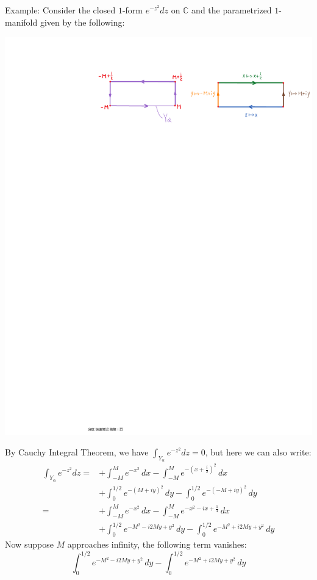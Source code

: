 \documentclass[15pt]{book}
\theoremstyle{break}
\theoremstyle{break}
\newcommand{\Complex}{\mathbb{C}}
\newcommand{\example}{\color{green}Example: \color{black}}
\begin{document}
\hfill\break
\hfill\break
\example Consider the closed $1$-form $e^{-z^2} dz$ on $\Complex$ and the parametrized $1$-manifold given by the following:\\
\begin{center}
\includegraphics[scale=0.9]{paths.pdf}
\end{center}

By Cauchy Integral Theorem, we have $\int_{Y_\alpha} e^{-z^2} dz = 0$, but here we can also write:
\begin{align*}
\int_{Y_\alpha}e^{-z^2} dz 
=& +\int_{-M}^M e^{-x^2}\, dx - \int_{-M}^M e^{-\left(x+\frac{i}{2}\right)^2} \,dx \\
&+ \int_{0}^{1/2} e^{-(M+iy)^2} \, dy - \int_0^{1/2}e^{-(-M+iy)^2}\, dy\\
=& + \int_{-M}^M e^{-x^2}\, dx - \int_{-M}^M e^{-x^2 - ix + \frac{1}{4}} \, dx \\
&+ \int_0^{1/2} e^{-M^2 - i2My + y^2} \, dy - \int_0^{1/2} e^{-M^2 + i2My + y^2} \, dy
\end{align*}
Now suppose $M$ approaches infinity, the following term vanishes:
$$\int_0^{1/2} e^{-M^2 - i2My + y^2} \, dy - \int_0^{1/2} e^{-M^2 + i2My + y^2} \, dy$$
 
\end{document}

